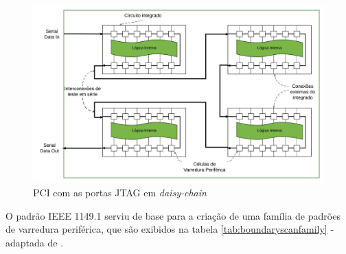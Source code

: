 \begin{figure}
    \centering
        \includegraphics[width=1.0\linewidth]{fig/cadeiabs}
            \caption{PCI com as portas JTAG em \textit{daisy-chain}}
            \label{fig:cadeiabs}
\end{figure}


O padrão IEEE 1149.1 serviu de base para a criação de uma família de padrões de varredura periférica, que são exibidos na tabela \ref{tab:boundaryscanfamily} - adaptada de \citet{jutman2014high}.  

